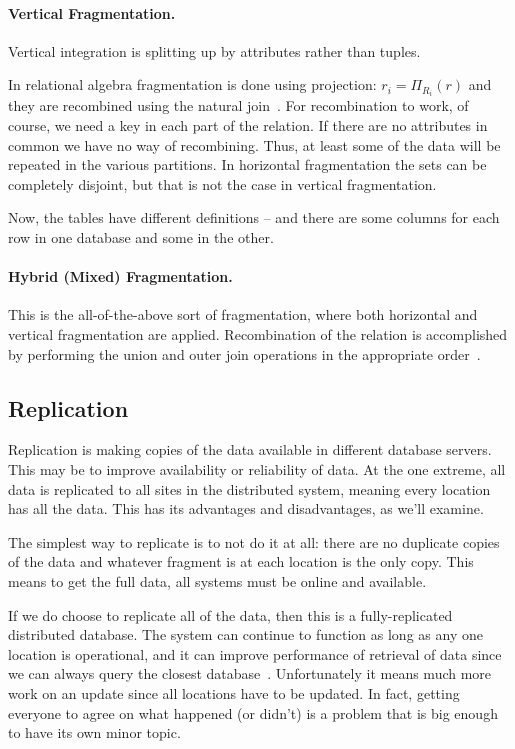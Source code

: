 \paragraph{Vertical Fragmentation.} Vertical integration is splitting up by attributes rather than tuples. 

In relational algebra fragmentation is done using projection: $r_{i} = \Pi_{R_{i}}
(r)$ and they are recombined using the natural join~\cite{dsc}.  For recombination to work, of course, we need a key in each part of the relation. If there are no attributes in common we have no way of recombining. Thus, at least some of the data will be repeated in the various partitions. In horizontal fragmentation the sets can be completely disjoint, but that is not the case in vertical fragmentation. 

Now, the tables have different definitions -- and there are some columns for each row in one database and some in the other. 


\paragraph{Hybrid (Mixed) Fragmentation.} This is the all-of-the-above sort of fragmentation, where both horizontal and vertical fragmentation are applied. Recombination of the relation is accomplished by performing the union and outer join operations in the appropriate order~\cite{fds}. 

\subsection*{Replication}

Replication is making copies of the data available in different database servers. This may be to improve availability or reliability of data. At the one extreme, all data is replicated to all sites in the distributed system, meaning every location has all the data. This has its advantages and disadvantages, as we'll examine. 

The simplest way to replicate is to not do it at all: there are no duplicate copies of the data and whatever fragment is at each location is the only copy. This means to get the full data, all systems must be online and available. 

If we do choose to replicate all of the data, then this is a fully-replicated distributed database. The system can continue to function as long as any one location is operational, and it can improve performance of retrieval of data since we can always query the closest database~\cite{fds}. Unfortunately it means much more work on an update since all locations have to be updated. In fact, getting everyone to agree on what happened (or didn't) is a problem that is big enough to have its own minor topic. 

